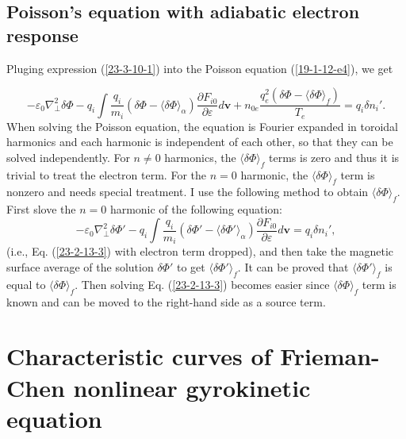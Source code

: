 \documentclass{article}
\begin{document}
\subsection{Poisson's equation with adiabatic electron response}

Pluging expression (\ref{23-3-10-1}) into the Poisson equation
(\ref{19-1-12-e4}), we get


\begin{equation}
  \label{23-2-13-3} - \varepsilon_0 \nabla^2_{\perp} \delta \Phi - q_i \int
  \frac{q_i}{m_i} (\delta \Phi - \langle \delta \Phi \rangle_{\alpha})
  \frac{\partial F_{i 0}}{\partial \varepsilon} d\mathbf{v}+ n_{0 e}
  \frac{q_e^2 (\delta \Phi - \langle \delta \Phi \rangle_f)}{T_e} = q_i \delta
  n_i' .
\end{equation}
When solving the Poisson equation, the equation is Fourier expanded in
toroidal harmonics and each harmonic is independent of each other, so that
they can be solved independently. For $n \neq 0$ harmonics, the $\langle
\delta \Phi \rangle_f$ terms is zero and thus it is trivial to treat the
electron term. For the $n = 0$ harmonic, the $\langle \delta \Phi \rangle_f$
term is nonzero and needs special treatment. I use the following method to
obtain $\langle \delta \Phi \rangle_f$. First slove the $n = 0$ harmonic of
the following equation:
\begin{equation}
  - \varepsilon_0 \nabla^2_{\perp} \delta \Phi' - q_i \int \frac{q_i}{m_i}
  (\delta \Phi' - \langle \delta \Phi' \rangle_{\alpha}) \frac{\partial F_{i
  0}}{\partial \varepsilon} d\mathbf{v}= q_i \delta n_i',
\end{equation}
(i.e., Eq. (\ref{23-2-13-3}) with electron term dropped), and then take the
magnetic surface average of the solution $\delta \Phi'$ to get $\langle \delta
\Phi' \rangle_f$. It can be proved that $\langle \delta \Phi' \rangle_f$ is
equal to $\langle \delta \Phi \rangle_f$. Then solving Eq. (\ref{23-2-13-3})
becomes easier since $\langle \delta \Phi \rangle_f$ term is known and can be
moved to the right-hand side as a source term.

\section{Characteristic curves of Frieman-Chen nonlinear gyrokinetic equation}
\end{document}
